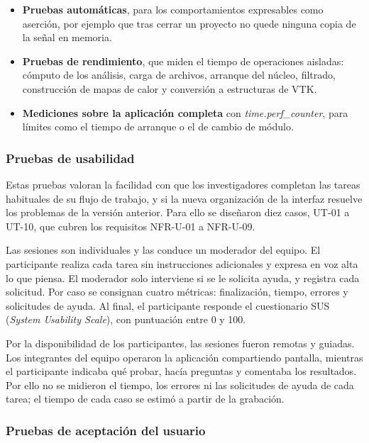 \documentclass[12pt,letterpaper,oneside]{article}
\begin{document}
\begin{itemize}
  \item \textbf{Pruebas automáticas}, para los comportamientos expresables como aserción, por ejemplo que tras cerrar un proyecto no quede ninguna copia de la señal en memoria.
  \item \textbf{Pruebas de rendimiento}, que miden el tiempo de operaciones aisladas: cómputo de los análisis, carga de archivos, arranque del núcleo, filtrado, construcción de mapas de calor y conversión a estructuras de VTK.
  \item \textbf{Mediciones sobre la aplicación completa} con \textit{time.perf\_counter}, para límites como el tiempo de arranque o el de cambio de módulo.
\end{itemize}

\subsubsection{Pruebas de usabilidad}

Estas pruebas valoran la facilidad con que los investigadores completan las tareas habituales de su flujo de trabajo, y si la nueva organización de la interfaz resuelve los problemas de la versión anterior. Para ello se diseñaron diez casos, UT-01 a UT-10, que cubren los requisitos NFR-U-01 a NFR-U-09.

Las sesiones son individuales y las conduce un moderador del equipo. El participante realiza cada tarea sin instrucciones adicionales y expresa en voz alta lo que piensa. El moderador solo interviene si se le solicita ayuda, y registra cada solicitud. Por caso se consignan cuatro métricas: finalización, tiempo, errores y solicitudes de ayuda. Al final, el participante responde el cuestionario SUS (\textit{System Usability Scale}), con puntuación entre 0 y 100.

Por la disponibilidad de los participantes, las sesiones fueron remotas y guiadas. Los integrantes del equipo operaron la aplicación compartiendo pantalla, mientras el participante indicaba qué probar, hacía preguntas y comentaba los resultados. Por ello no se midieron el tiempo, los errores ni las solicitudes de ayuda de cada tarea; el tiempo de cada caso se estimó a partir de la grabación. 

\subsubsection{Pruebas de aceptación del usuario}
\end{document}
